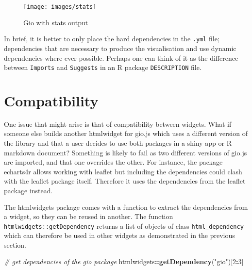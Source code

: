 \documentclass[10pt,]{krantz}
\makeatletter
\newenvironment{Shaded}{\begin{snugshade}}{\end{snugshade}}
\newcommand{\CommentTok}[1]{\textcolor[rgb]{0.37,0.37,0.37}{\textit{#1}}}
\newcommand{\DecValTok}[1]{\textcolor[rgb]{0.06,0.06,0.06}{#1}}
\newcommand{\KeywordTok}[1]{\textcolor[rgb]{0.27,0.27,0.27}{\textbf{#1}}}
\newcommand{\NormalTok}[1]{#1}
\newcommand{\OperatorTok}[1]{\textcolor[rgb]{0.43,0.43,0.43}{\textbf{#1}}}
\newcommand{\StringTok}[1]{\textcolor[rgb]{0.5,0.5,0.5}{#1}}
\newenvironment{kframe}{%
\medskip{}
\setlength{\fboxsep}{.8em}
 \def\at@end@of@kframe{}%
 \ifinner\ifhmode%
  \def\at@end@of@kframe{\end{minipage}}%
  \begin{minipage}{\columnwidth}%
 \fi\fi%
 \def\FrameCommand##1{\hskip\@totalleftmargin \hskip-\fboxsep
 \colorbox{shadecolor}{##1}\hskip-\fboxsep
     \hskip-\linewidth \hskip-\@totalleftmargin \hskip\columnwidth}%
 \MakeFramed {\advance\hsize-\width
   \@totalleftmargin\z@ \linewidth\hsize
   \@setminipage}}%
 {\par\unskip\endMakeFramed%
 \at@end@of@kframe}
\renewenvironment{Shaded}{\begin{kframe}}{\end{kframe}}
\makeatother
\begin{document}
\begin{Shaded}
\end{Shaded}

\begin{figure}[H]

{\centering \texttt{[image: images/stats]} 

}

\caption{Gio with stats output}\label{fig:gio-stats}
\end{figure}

In brief, it is better to only place the hard dependencies in the \texttt{.yml} file; dependencies that are necessary to produce the visualisation and use dynamic dependencies where ever possible. Perhaps one can think of it as the difference between \texttt{Imports} and \texttt{Suggests} in an R package \texttt{DESCRIPTION} file.

\hypertarget{widgets-adv-compatibility}{%
\section{Compatibility}\label{widgets-adv-compatibility}}

One issue that might arise is that of compatibility between widgets. What if someone else builds another htmlwidget for gio.js which uses a different version of the library and that a user decides to use both packages in a shiny app or R markdown document? Something is likely to fail as two different versions of gio.js are imported, and that one overrides the other. For instance, the package echarts4r \citep{R-echarts4r} allows working with leaflet but including the dependencies could clash with the leaflet package itself. Therefore it uses the dependencies from the leaflet package instead.

The htmlwidgets package comes with a function to extract the dependencies from a widget, so they can be reused in another. The function \texttt{htmlwidgets::getDependency} returns a list of objects of class \texttt{html\_dependency} which can therefore be used in other widgets as demonstrated in the previous section.

\begin{Shaded}
\begin{Highlighting}[]
\CommentTok{# get dependencies of the gio package}
\NormalTok{htmlwidgets}\OperatorTok{::}\KeywordTok{getDependency}\NormalTok{(}\StringTok{"gio"}\NormalTok{)[}\DecValTok{2}\OperatorTok{:}\DecValTok{3}\NormalTok{]}
\end{Highlighting}
\end{Shaded}
\end{document}
